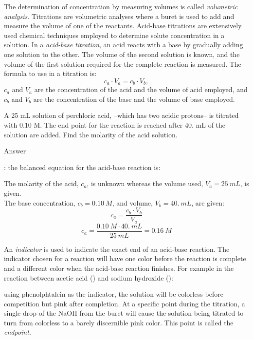 \documentclass[main.tex]{subfiles}
\begin{document}
\vspace{0.2cm}{\large \bfseries Volumetric analysis} The determination of concentration by measuring volumes is called \textit{volumetric analysis}. Titrations are volumetric analyses where a buret is used to add and measure the volume of one of the reactants. Acid-base titrations are extensively used chemical techniques employed to determine solute concentration in a solution. In a \textit{acid-base titration}, an acid reacts with a base by gradually adding one solution to the other. The volume of the second solution is known, and the volume of the first solution required for the complete reaction is measured. The formula to use in a titration is:
\[ c_a\cdot V_a= c_b\cdot V_b,\]
$c_a$ and $V_a$ are the concentration of the acid and the volume of acid employed, and  $c_b$ and $V_b$ are the concentration of the base and the volume of base employed. 
\begin{center}\begin{example}{ }
\begin{it}A 25 mL solution of perchloric acid,  --which has two acidic protons-- is titrated with  0.10 M. The end point for the reaction is reached after 40. mL of the  solution are added. Find the molarity of the acid solution.\end{it}
\Sepline
\begin{bf}Answer\end{bf}: the balanced equation for the acid-base reaction is:\\
\begin{center}\end{center}
The molarity of the acid, $c_a$, is unknown whereas the volume used, $V_a=25\:mL$, is given.\\
The base concentration, $c_b=0.10\:M$, and volume, $V_b=40.\:mL$, are given:
\[c_a=\frac{ c_b\cdot V_b}{ V_a}\]
\[c_a=\frac{ 0.10\:M\cdot 40.\:mL}{25\:mL}=0.16\:M\]
\end{example}\end{center}


An \textit{indicator} is used to indicate the exact end of an acid-base reaction. The indicator chosen for a reaction will have one color before the reaction is complete and a different color when the acid-base reaction finishes. 
For example in the reaction between acetic acid () and sodium hydroxide ():
\begin{center}\end{center}
using phenolphtalein as the indicator, the solution will be colorless before competition but pink after completion. At a specific point during the titration, a single drop of the NaOH from the buret will cause the solution being titrated to turn from colorless to a barely discernible pink color. This point is called the \textit{endpoint}. 
\end{document}
